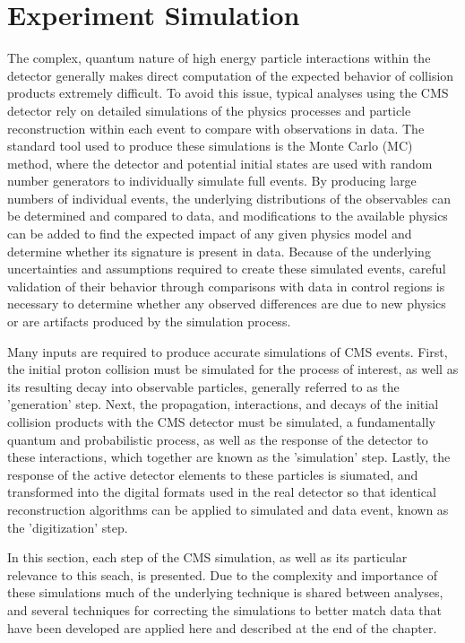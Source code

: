 \chapter{Experiment Simulation}
\label{simulation_chapter}
The complex, quantum nature of high energy particle interactions within the detector generally makes direct computation of the expected behavior of collision products extremely difficult.
To avoid this issue, typical analyses using the CMS detector rely on detailed simulations of the physics processes and particle reconstruction within each event to compare with observations in data.
The standard tool used to produce these simulations is the Monte Carlo (MC) method, where the detector and potential initial states are used with random number generators to individually simulate full events.
By producing large numbers of individual events, the underlying distributions of the observables can be determined and compared to data, and modifications to the available physics can be added to find the expected impact of any given physics model and determine whether its signature is present in data.
Because of the underlying uncertainties and assumptions required to create these simulated events, careful validation of their behavior through comparisons with data in control regions is necessary to determine whether any observed differences are due to new physics or are artifacts produced by the simulation process.

Many inputs are required to produce accurate simulations of CMS events.
First, the initial proton collision must be simulated for the process of interest, as well as its resulting decay into observable particles, generally referred to as the 'generation' step.
Next, the propagation, interactions, and decays of the initial collision products with the CMS detector must be simulated, a fundamentally quantum and probabilistic process, as well as the response of the detector to these interactions, which together are known as the 'simulation' step.
Lastly, the response of the active detector elements to these particles is siumated, and transformed into the digital formats used in the real detector so that identical reconstruction algorithms can be applied to simulated and data event, known as the 'digitization' step.

In this section, each step of the CMS simulation, as well as its particular relevance to this seach, is presented.
Due to the complexity and importance of these simulations much of the underlying technique is shared between analyses, and several techniques for correcting the simulations to better match data that have been developed are applied here and described at the end of the chapter. 


